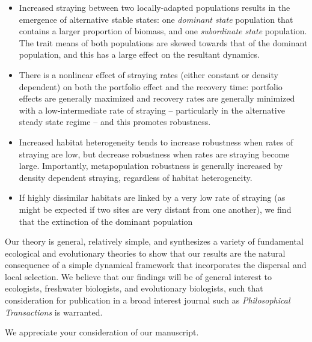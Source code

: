 \documentclass[ucm,12pt]{ucletter}
\begin{document}
\begin{letter}
\begin{itemize}
  \item Increased straying between two locally-adapted populations results in the emergence of alternative stable states: one \emph{dominant state} population that contains a larger proportion of biomass, and one \emph{subordinate state} population.
  The trait means of both populations are skewed towards that of the dominant population, and this has a large effect on the resultant dynamics.
  \item There is a nonlinear effect of straying rates (either constant or density dependent) on both the portfolio effect and the recovery time: portfolio effects are generally maximized and recovery rates are generally minimized with a low-intermediate rate of straying -- particularly in the alternative steady state regime -- and this promotes robustness.
  \item Increased habitat heterogeneity tends to increase robustness when rates of straying are low, but decrease robustness when rates are straying become large. Importantly, metapopulation robustness is generally increased by density dependent straying, regardless of habitat heterogeneity.
  \item If highly dissimilar habitats are linked by a very low rate of straying (as might be expected if two sites are very distant from one another), we find that the extinction of the dominant population 
\end{itemize}


Our theory is general, relatively simple, and synthesizes a variety of fundamental ecological and evolutionary theories to show that our results are the natural consequence of a simple dynamical framework that incorporates the dispersal and local selection. 
We believe that our findings will be of general interest to ecologists, freshwater biologists, and evolutionary biologists, such that consideration for publication in a broad interest journal such as \emph{Philosophical Transactions} is warranted.

We appreciate your consideration of our manuscript.


\vspace{5mm}


\end{letter}
\end{document}
